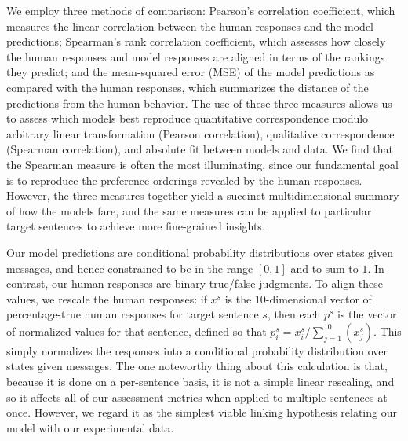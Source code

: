\documentclass[leqno,12pt]{article}
\begin{document}
We employ three methods of comparison: Pearson's correlation
coefficient, which measures the linear correlation between the human
responses and the model predictions; Spearman's rank correlation
coefficient, which assesses how closely the human responses and model
responses are aligned in terms of the rankings they predict; and the
mean-squared error (MSE) of the model predictions as compared with the
human responses, which summarizes the distance of the predictions from
the human behavior. The use of these three measures allows us to
assess which models best reproduce quantitative correspondence modulo
arbitrary linear transformation (Pearson correlation), qualitative
correspondence (Spearman correlation), and absolute fit between models
and data. We find that the Spearman measure is often the most
illuminating, since our fundamental goal is to reproduce the
preference orderings revealed by the human responses.  However, the
three measures together yield a succinct multidimensional summary of
how the models fare, and the same measures can be applied to
particular target sentences to achieve more fine-grained insights.


Our model predictions are conditional probability distributions over
states given messages, and hence constrained to be in the range
$[0,1]$ and to sum to $1$. In contrast, our human responses are binary
true/false judgments. To align these values, we rescale the human
responses: if $x^{s}$ is the $10$-dimensional vector of
percentage-true human responses for target sentence $s$, then each
$p^{s}$ is the vector of normalized values for that sentence, defined
so that $p^{s}_{i} = x^{s}_{i}/\sum_{j=1}^{10}(x^{s}_{j})$. This
simply normalizes the responses into a conditional probability
distribution over states given messages. The one noteworthy thing
about this calculation is that, because it is done on a per-sentence
basis, it is not a simple linear rescaling, and so it affects all of
our assessment metrics when applied to multiple sentences at
once. However, we regard it as the simplest viable linking hypothesis
relating our model with our experimental data.
\end{document}
